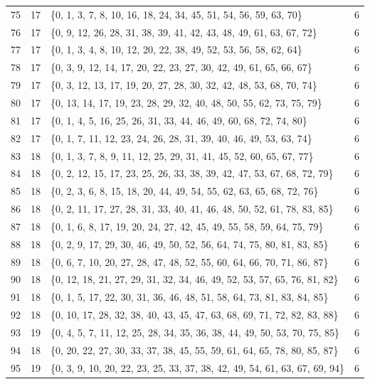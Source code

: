 \documentclass[12pt,a4paper,reqno]{amsart}
\numberwithin{equation}{section}
\theoremstyle{plain}
\theoremstyle{definition}
\begin{document}
\begin{longtable}{c|c|>{\raggedright\arraybackslash}p{}|c}
75 & 17 & \{0, 1, 3, 7, 8, 10, 16, 18, 24, 34, 45, 51, 54, 56, 59, 63, 70\} & 6\\
76 & 17 & \{0, 9, 12, 26, 28, 31, 38, 39, 41, 42, 43, 48, 49, 61, 63, 67, 72\} & 6\\
77 & 17 & \{0, 1, 3, 4, 8, 10, 12, 20, 22, 38, 49, 52, 53, 56, 58, 62, 64\} & 6\\
78 & 17 & \{0, 3, 9, 12, 14, 17, 20, 22, 23, 27, 30, 42, 49, 61, 65, 66, 67\} & 6\\
79 & 17 & \{0, 3, 12, 13, 17, 19, 20, 27, 28, 30, 32, 42, 48, 53, 68, 70, 74\} & 6\\
80 & 17 & \{0, 13, 14, 17, 19, 23, 28, 29, 32, 40, 48, 50, 55, 62, 73, 75, 79\} & 6\\
81 & 17 & \{0, 1, 4, 5, 16, 25, 26, 31, 33, 44, 46, 49, 60, 68, 72, 74, 80\} & 6\\
82 & 17 & \{0, 1, 7, 11, 12, 23, 24, 26, 28, 31, 39, 40, 46, 49, 53, 63, 74\} & 6\\
83 & 18 & \{0, 1, 3, 7, 8, 9, 11, 12, 25, 29, 31, 41, 45, 52, 60, 65, 67, 77\} & 6\\
84 & 18 & \{0, 2, 12, 15, 17, 23, 25, 26, 33, 38, 39, 42, 47, 53, 67, 68, 72, 79\} & 6\\
85 & 18 & \{0, 2, 3, 6, 8, 15, 18, 20, 44, 49, 54, 55, 62, 63, 65, 68, 72, 76\} & 6\\
86 & 18 & \{0, 2, 11, 17, 27, 28, 31, 33, 40, 41, 46, 48, 50, 52, 61, 78, 83, 85\} & 6\\
87 & 18 & \{0, 1, 6, 8, 17, 19, 20, 24, 27, 42, 45, 49, 55, 58, 59, 64, 75, 79\} & 6\\
88 & 18 & \{0, 2, 9, 17, 29, 30, 46, 49, 50, 52, 56, 64, 74, 75, 80, 81, 83, 85\} & 6\\
89 & 18 & \{0, 6, 7, 10, 20, 27, 28, 47, 48, 52, 55, 60, 64, 66, 70, 71, 86, 87\} & 6\\
90 & 18 & \{0, 12, 18, 21, 27, 29, 31, 32, 34, 46, 49, 52, 53, 57, 65, 76, 81, 82\} & 6\\
91 & 18 & \{0, 1, 5, 17, 22, 30, 31, 36, 46, 48, 51, 58, 64, 73, 81, 83, 84, 85\} & 6\\
92 & 18 & \{0, 10, 17, 28, 32, 38, 40, 43, 45, 47, 63, 68, 69, 71, 72, 82, 83, 88\} & 6\\
93 & 19 & \{0, 4, 5, 7, 11, 12, 25, 28, 34, 35, 36, 38, 44, 49, 50, 53, 70, 75, 85\} & 6\\
94 & 18 & \{0, 20, 22, 27, 30, 33, 37, 38, 45, 55, 59, 61, 64, 65, 78, 80, 85, 87\} & 6\\
95 & 19 & \{0, 3, 9, 10, 20, 22, 23, 25, 33, 37, 38, 42, 49, 54, 61, 63, 67, 69, 94\} & 6\\

\end{longtable}
\end{document}
